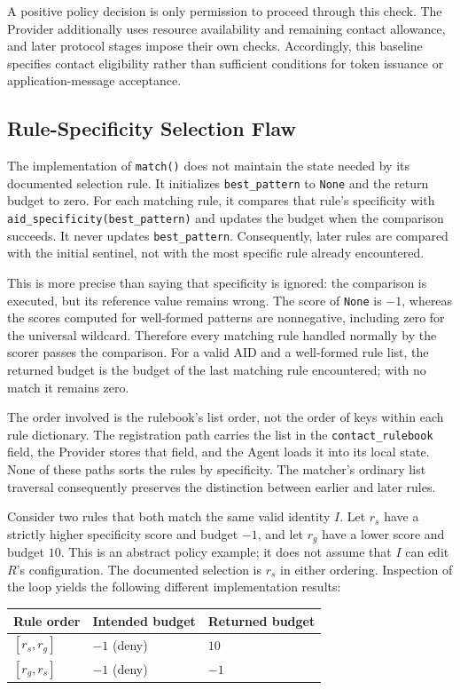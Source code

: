 A positive policy decision is only permission to proceed through this check.
The Provider additionally uses resource availability and remaining contact
allowance, and later protocol stages impose their own checks. Accordingly,
this baseline specifies contact eligibility rather than sufficient conditions
for token issuance or application-message acceptance.


\subsection{Rule-Specificity Selection Flaw}

The implementation of \texttt{match()} does not maintain the state needed by
its documented selection rule. It initializes \texttt{best\_pattern} to
\texttt{None} and the return budget to zero. For each matching rule, it compares
that rule's specificity with \texttt{aid\_specificity(best\_pattern)} and
updates the budget when the comparison succeeds. It never updates
\texttt{best\_pattern}. Consequently, later rules are compared with the initial
sentinel, not with the most specific rule already encountered.

This is more precise than saying that specificity is ignored: the comparison
is executed, but its reference value remains wrong. The score of
\texttt{None} is $-1$, whereas the scores computed for well-formed patterns
are nonnegative, including zero for the universal wildcard. Therefore every
matching rule handled normally by the scorer passes the comparison. For a
valid AID and a well-formed rule list, the returned budget is the budget of
the last matching rule encountered; with no match it remains zero.

The order involved is the rulebook's list order, not the order of keys within
each rule dictionary. The registration path carries the list in the
\texttt{contact\_rulebook} field, the Provider stores that field, and the Agent
loads it into its local state. None of these paths sorts the rules by
specificity. The matcher's ordinary list traversal consequently preserves
the distinction between earlier and later rules.

Consider two rules that both match the same valid identity $I$. Let $r_s$
have a strictly higher specificity score and budget $-1$, and let $r_g$ have
a lower score and budget $10$. This is an abstract policy example; it does
not assume that $I$ can edit $R$'s configuration. The documented selection is
$r_s$ in either ordering. Inspection of the loop yields the following
different implementation results:
\begin{center}
\begin{tabular}{lll}
\hline
Rule order & Intended budget & Returned budget \\
\hline
$[r_s,r_g]$ & $-1$ (deny) & $10$ \\
$[r_g,r_s]$ & $-1$ (deny) & $-1$ \\
\hline
\end{tabular}
\end{center}

